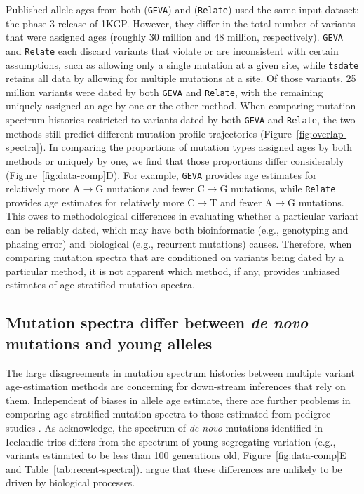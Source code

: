 \documentclass[]{article}
\newcommand{\GEVA}{\texttt{GEVA}\xspace}
\newcommand{\tsdate}{\texttt{tsdate}\xspace}
\newcommand{\relate}{\texttt{Relate}\xspace}
\begin{document}
Published allele ages from both \citet{albers2020dating} (\GEVA) and
\citet{speidel2019method} (\relate) used the same input dataset: the phase 3
release of 1KGP. However, they differ in the total number of variants that were
assigned ages (roughly 30 million and 48 million, respectively). \GEVA and
\relate each discard variants that violate or are inconsistent with certain
assumptions, such as allowing only a single mutation at a given site,
while \tsdate retains all data by allowing for multiple mutations at a site.
Of those variants, 25 million variants were dated by both \GEVA and \relate,
with the remaining uniquely
assigned an age by one or the other method. When comparing mutation spectrum
histories restricted to variants dated by both \GEVA and \relate, the two
methods still predict different mutation profile trajectories
(Figure~\ref{fig:overlap-spectra}). In comparing the proportions of mutation
types assigned ages by both methods or uniquely by one, we find that those
proportions differ considerably (Figure~\ref{fig:data-comp}D). For example,
\GEVA provides age estimates for relatively more A$\rightarrow$G mutations and
fewer C$\rightarrow$G mutations, while \relate provides age estimates for
relatively more C$\rightarrow$T and fewer A$\rightarrow$G mutations. This owes
to methodological differences in evaluating whether a particular variant can be
reliably dated, which may have both bioinformatic (e.g., genotyping and phasing
error) and biological (e.g., recurrent mutations) causes. Therefore, when
comparing mutation spectra that are conditioned on variants being dated by a
particular method, it is not apparent which method, if any, provides unbiased
estimates of age-stratified mutation spectra.

\subsection*{Mutation spectra differ between \emph{de novo} mutations and young
alleles}

The large disagreements in mutation spectrum histories between multiple variant
age-estimation methods are concerning for down-stream inferences that rely on
them. Independent of biases in allele age estimate, there are further problems
in comparing age-stratified mutation spectra to those estimated from pedigree
studies \citep{jonsson2017parental,halldorsson2019characterizing}. As
\citet{wang2023human} acknowledge, the spectrum of \emph{de novo} mutations
identified in Icelandic trios \citep{jonsson2017parental} differs from the
spectrum of young segregating variation (e.g., variants estimated to be less
than 100 generations old, Figure~\ref{fig:data-comp}E and
Table~\ref{tab:recent-spectra}). \citet{gao2022limited} argue that these
differences are unlikely to be driven by biological processes.
\end{document}
